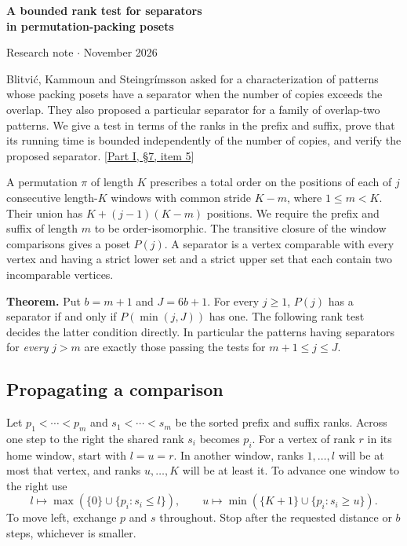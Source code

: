 \documentclass[11pt]{article}
\begin{document}
\begin{center}{\Large\bfseries A bounded rank test for separators\\ in permutation-packing posets}\par
\small Research note \enspace$\cdot$ November 2026\end{center}

Blitvi\'c, Kammoun and Steingr\'imsson asked for a characterization of patterns whose packing posets have a separator when the number of copies exceeds the overlap. They also proposed a particular separator for a family of overlap-two patterns. We give a test in terms of the ranks in the prefix and suffix, prove that its running time is bounded independently of the number of copies, and verify the proposed separator. [\href{https://arxiv.org/html/2610.29846v1\#S7}{Part I, \S7, item 5}]

A permutation $\pi$ of length $K$ prescribes a total order on the positions of each of $j$ consecutive length-$K$ windows with common stride $K-m$, where $1\le m<K$. Their union has $K+(j-1)(K-m)$ positions. We require the prefix and suffix of length $m$ to be order-isomorphic. The transitive closure of the window comparisons gives a poset $P(j)$. A separator is a vertex comparable with every vertex and having a strict lower set and a strict upper set that each contain two incomparable vertices.

\textbf{Theorem.} Put $b=m+1$ and $J=6b+1$. For every $j\ge1$, $P(j)$ has a separator if and only if $P(\min(j,J))$ has one. The following rank test decides the latter condition directly. In particular the patterns having separators for \emph{every} $j>m$ are exactly those passing the tests for $m+1\le j\le J$.

\subsection*{Propagating a comparison}
Let $p_1<\cdots<p_m$ and $s_1<\cdots<s_m$ be the sorted prefix and suffix ranks. Across one step to the right the shared rank $s_i$ becomes $p_i$. For a vertex of rank $r$ in its home window, start with $l=u=r$. In another window, ranks $1,\ldots,l$ will be at most that vertex, and ranks $u,\ldots,K$ will be at least it. To advance one window to the right use
\[
 l\longmapsto\max(\{0\}\cup\{p_i:s_i\le l\}),\qquad
 u\longmapsto\min(\{K+1\}\cup\{p_i:s_i\ge u\}).
\]
To move left, exchange $p$ and $s$ throughout. Stop after the requested distance or $b$ steps, whichever is smaller.
\end{document}
